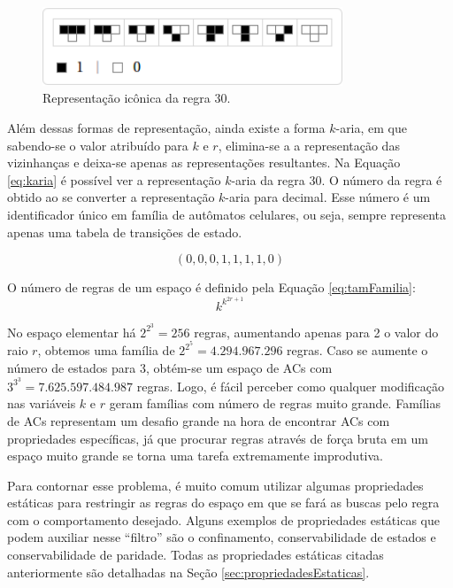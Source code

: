 \documentclass[12pt,a4paper]{article}
\begin{document}
	\begin{figure}[h!]
	  \centering
	  \includegraphics[width=0.8\textwidth]{fig_repIconicaR30.png}
	  \caption{Representação icônica da regra 30.}
	  \label{fig:repIconicaR30}
	\end{figure}

Além dessas formas de representação, ainda existe a forma $k$-aria, em que sabendo-se o valor atribuído para $k$ e $r$, elimina-se a a representação das vizinhanças e deixa-se apenas as representações resultantes. Na Equação \ref{eq:karia} é possível ver a representação $k$-aria da regra 30. O número da regra é obtido ao se converter a representação $k$-aria para decimal. Esse número é um identificador único em família de autômatos celulares, ou seja, sempre representa apenas uma tabela de transições de estado.

\begin{equation}
(0,0,0,1,1,1,1,0)
\label{eq:karia}
\end{equation}

O número de regras de um espaço é definido pela Equação \ref{eq:tamFamilia}:
\begin{equation}
k^{k^{2r+1}}
\label{eq:tamFamilia}
\end{equation}

No espaço elementar há $2^{2^{3}} = 256$ regras, aumentando apenas para 2 o valor do raio $r$, obtemos uma família de $2^{2^{5}} = 4.294.967.296$ regras. Caso se aumente o número de estados para 3, obtém-se um espaço de ACs com $3^{3^{3}} = 7.625.597.484.987$ regras. Logo, é fácil perceber como qualquer modificação nas variáveis $k$ e $r$ geram famílias com número de regras muito grande. Famílias de ACs representam um desafio grande na hora de encontrar ACs com propriedades específicas, já que procurar regras através de força bruta em um espaço muito grande se torna uma tarefa extremamente improdutiva.

Para contornar esse problema, é muito comum utilizar algumas propriedades estáticas para restringir as regras do espaço em que se fará as buscas pelo regra com o comportamento desejado. Alguns exemplos de propriedades estáticas que podem auxiliar nesse ``filtro'' são o confinamento, conservabilidade de estados e conservabilidade de paridade. Todas as propriedades estáticas citadas anteriormente são detalhadas na Seção \ref{sec:propriedadesEstaticas}.
\end{document}
